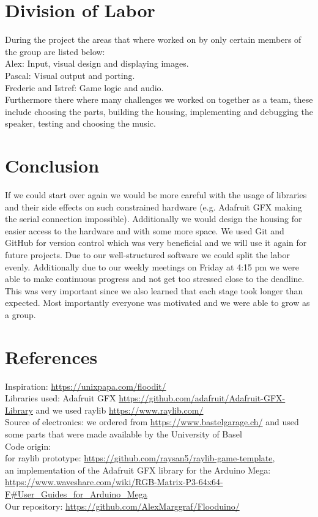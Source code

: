 \documentclass[10pt, a4paper]{article}
\begin{document}
\section*{Division of Labor}
During the project the areas that where worked on by only certain members of the group are listed below:\\
Alex: Input, visual design and displaying images.\\
Pascal: Visual output and porting.\\
Frederic and Istref: Game logic and audio.\\
Furthermore there where many challenges we worked on together as a team, these include choosing the parts, building the housing, implementing and debugging the speaker, testing and choosing the music.

\section*{Conclusion}

If we could start over again we would be more careful with the usage of libraries and their side effects on such constrained hardware (e.g. Adafruit GFX making the serial connection impossible). 
Additionally we would design the housing for easier access to the hardware and with some more space. We used Git and GitHub for version control which was very beneficial and we will use it again for future projects. Due to our well-structured software we could split the labor evenly. Additionally due to our weekly meetings on Friday at 4:15 pm we were able to make continuous progress and not get too stressed close to the deadline. This was very important since we also learned that each stage took longer than expected. 
Most importantly everyone was motivated and we were able to grow as a group. 


\section*{References}
\label{sec:references}
Inspiration: \url{https://unixpapa.com/floodit/} \\
Libraries used: Adafruit GFX \url{https://github.com/adafruit/Adafruit-GFX-Library} and we used raylib \url{https://www.raylib.com/} \\
Source of electronics: we ordered from \url{https://www.bastelgarage.ch/} and used some parts that were made available by the University of Basel \\
Code origin: \\
for raylib prototype: \url{https://github.com/raysan5/raylib-game-template}, \\
an implementation of the Adafruit GFX library for the Arduino Mega: \url{https://www.waveshare.com/wiki/RGB-Matrix-P3-64x64-F#User_Guides_for_Arduino_Mega} \\
Our repository: \url{https://github.com/AlexMarggraf/Flooduino/}
\end{document}

